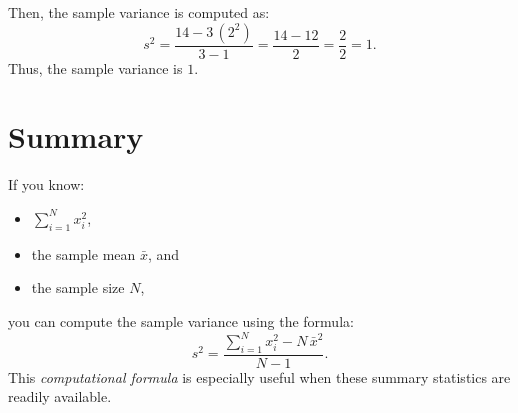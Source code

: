 \documentclass[12pt]{article}
\begin{document}
Then, the sample variance is computed as:
\[
s^2 = \frac{14 - 3\,(2^2)}{3-1}
= \frac{14 - 12}{2}
= \frac{2}{2} = 1.
\]
Thus, the sample variance is \(1\).

\section{Summary}
If you know:
\begin{itemize}
    \item \(\sum_{i=1}^{N} x_i^2\), 
    \item the sample mean \(\bar{x}\), and 
    \item the sample size \(N\),
\end{itemize}
you can compute the sample variance using the formula:
\[
s^2 = \frac{\sum_{i=1}^{N} x_i^2 - N\,\bar{x}^2}{N-1}.
\]
This \emph{computational formula} is especially useful when these summary statistics are readily available.
\end{document}
